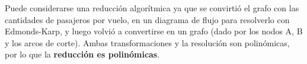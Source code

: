 \documentclass[../tp3_grupo404.tex]{subfiles}
\begin{document}
Puede considerarse una reducción algorítmica ya que se convirtió el grafo con las cantidades de
pasajeros por vuelo, en un diagrama de flujo para resolverlo con Edmonds-Karp, y luego volvió
a convertirse en un grafo (dado por los nodos A, B y los arcos de corte).
Ambas transformaciones y la resolución son polinómicas, por lo que la \textbf{reducción es polinómicas}.

\end{document}
